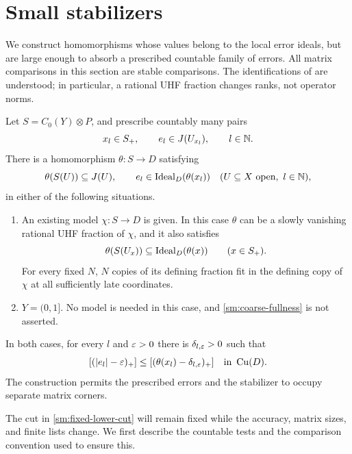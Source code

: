 \section{Small stabilizers}\label{sm:section}

We construct homomorphisms whose values belong to the local error
ideals, but are large enough to absorb a prescribed countable family
of errors.  All matrix comparisons in this section are stable
comparisons.  The identifications of
 are understood; in particular, a rational UHF
fraction changes ranks, not operator norms.

\begin{theorem}\label{sm:stabilizers}
Let \(S=C_0(Y)\otimes P\), and prescribe countably many pairs
\[
 x_l\in S_+,
 \qquad e_l\in J(U_{x_l}),
 \qquad l\in\mathbb N.
\]
There is a homomorphism \(\theta:S\to D\) satisfying
\begin{equation}\label{sm:local-and-lower}
 \theta(S(U))\subseteq J(U),
 \qquad
 e_l\in\operatorname{Ideal}_D(\theta(x_l))
 \quad(U\subseteq X\text{ open},\ l\in\mathbb N),
\end{equation}
in either of the following situations.
\begin{enumerate}[label=\textup{(\roman*)}]
\item An existing model \(\chi:S\to D\) is given.
In this case \(\theta\) can be a slowly vanishing rational UHF
fraction of \(\chi\), and it also satisfies
\begin{equation}\label{sm:coarse-fullness}
 \theta(S(U_x))\subseteq\operatorname{Ideal}_D(\theta(x))
 \qquad(x\in S_+).
\end{equation}
For every fixed \(N\), \(N\) copies of its defining fraction
fit in the defining copy of \(\chi\) at all sufficiently late
coordinates.
\item \(Y=(0,1]\).  No model is needed in this case, and
\eqref{sm:coarse-fullness} is not asserted.
\end{enumerate}
In both cases, for every \(l\) and \(\varepsilon>0\) there is
\(\delta_{l,\varepsilon}>0\) such that
\begin{equation}\label{sm:fixed-lower-cut}
 [ (|e_l|-\varepsilon)_+]
 \leq[(\theta(x_l)-\delta_{l,\varepsilon})_+]
 \quad\text{in }\operatorname{Cu}(D).
\end{equation}
The construction permits the prescribed errors and the stabilizer
to occupy separate matrix corners.
\end{theorem}

The cut in \eqref{sm:fixed-lower-cut} will remain fixed while the
accuracy, matrix sizes, and finite lists change.  We first describe
the countable tests and the comparison convention used to ensure
this.

